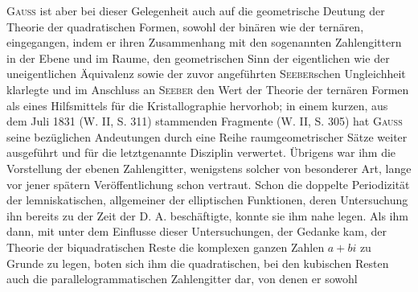 \textsc{Gauss} ist aber bei dieser Gelegenheit auch auf die geometrische Deutung der Theorie der quadratischen Formen, sowohl der binären wie der ternären, eingegangen, indem er ihren Zusammenhang mit den sogenannten Zahlengittern in der Ebene und im Raume, den geometrischen Sinn der eigentlichen wie der uneigentlichen Äquivalenz sowie der zuvor angeführten \textsc{Seeber}schen Ungleichheit klarlegte und im Anschluss an \textsc{Seeber} den Wert der Theorie der ternären Formen als eines Hilfsmittels für die Kristallographie hervorhob; in einem kurzen, aus dem Juli 1831 (W. II, S. 311) stammenden Fragmente (W. II, S. 305) hat \textsc{Gauss} seine bezüglichen Andeutungen durch eine Reihe raumgeometrischer Sätze weiter ausgeführt und für die letztgenannte Disziplin verwertet. Übrigens war ihm die Vorstellung der ebenen Zahlengitter, wenigstens solcher von besonderer Art, lange vor jener spätern Veröffentlichung schon vertraut. Schon die doppelte Periodizität der lemniskatischen, allgemeiner der elliptischen Funktionen, deren Untersuchung ihn bereits zu der Zeit der D. A. beschäftigte, konnte sie ihm nahe legen. Als ihm dann, mit unter dem Einflusse dieser Untersuchungen, der Gedanke kam, der Theorie der biquadratischen Reste die komplexen ganzen Zahlen \(a+bi\) zu Grunde zu legen, boten sich ihm die quadratischen, bei den kubischen Resten auch die parallelogrammatischen Zahlengitter dar, von denen er sowohl
\newpage{}
